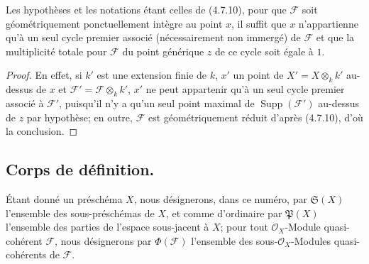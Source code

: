 \begin{proposition}[4.7.13]
\label{IV.2.4.7.13-fr}
Les hypothèses et les notations étant celles de \textup{(4.7.10)}, pour que
$\mathscr F$ soit géométriquement ponctuellement intègre au point $x$, il
suffit que $x$ n'appartienne qu'à un seul cycle premier associé
(nécessairement non immergé) de $\mathscr F$ et que la multiplicité totale
pour $\mathscr F$ du point générique $z$ de ce cycle soit égale à $1$.
\end{proposition}

\begin{proof}
En effet, si $k'$ est une extension finie de $k$, $x'$ un point de
$X'=X\otimes_k k'$ au-dessus de $x$ et
$\mathscr F'=\mathscr F\otimes_k k'$, $x'$ ne peut appartenir qu'à un seul
cycle premier associé à $\mathscr F'$, puisqu'il n'y a qu'un seul point
maximal de $\operatorname{Supp}(\mathscr F')$ au-dessus de $z$ par hypothèse;
en outre, $\mathscr F$ est géométriquement réduit d'après (4.7.10), d'où la
conclusion.
\end{proof}
\subsection{Corps de définition.}
\label{subsection:IV.4.8-fr}

\begin{env}[4.8.1]
\label{IV.2.4.8.1-fr}
Étant donné un préschéma $X$, nous désignerons, dans ce numéro, par
$\mathfrak S(X)$ l'ensemble des sous-préschémas de $X$, et comme d'ordinaire
par $\mathfrak P(X)$ l'ensemble des parties de l'espace sous-jacent à $X$;
pour tout $\mathcal O_X$-Module quasi-cohérent $\mathscr F$, nous désignerons
par $\Phi(\mathscr F)$ l'ensemble des sous-$\mathcal O_X$-Modules
quasi-cohérents de $\mathscr F$.
\end{env}


